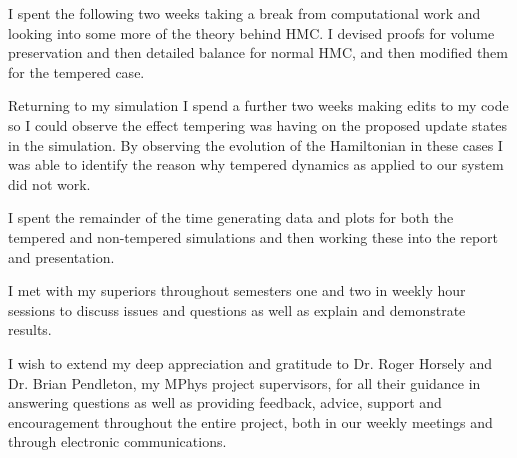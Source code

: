 \documentclass[12pt]{article}
\begin{document}
    I spent the following two weeks taking a break from computational work and looking into some more of the theory behind HMC. I devised proofs for volume preservation and then detailed balance for normal HMC, and then modified them for the tempered case.

    Returning to my simulation I spend a further two weeks making edits to my code so I could observe the effect tempering was having on the proposed update states in the simulation. By observing the evolution of the Hamiltonian in these cases I was able to identify the reason why tempered dynamics as applied to our system did not work.

    I spent the remainder of the time generating data and plots for both the tempered and non-tempered simulations and then working these into the report and presentation. 

    I met with my superiors throughout semesters one and two in weekly hour sessions to discuss issues and questions as well as explain and demonstrate results.



\acknowledgments
I wish to extend my deep appreciation and gratitude to Dr. Roger Horsely and Dr. Brian Pendleton, my MPhys project supervisors, for all their guidance in answering questions as well as providing feedback, advice, support and encouragement throughout the entire project, both in our weekly meetings and through electronic communications.



\maintext
\end{document}
